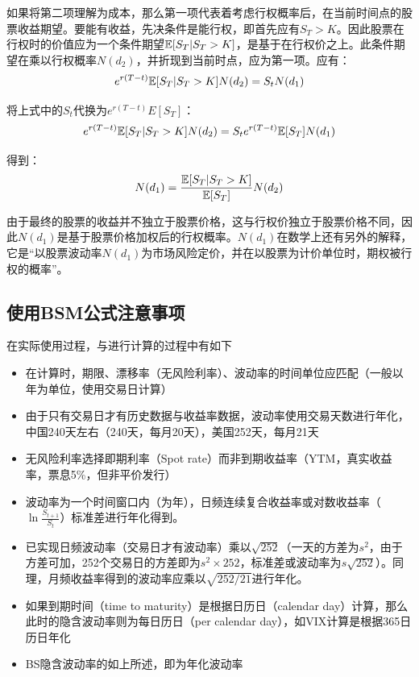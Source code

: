 \documentclass[11pt]{article}
\begin{document}
如果将第二项理解为成本，那么第一项代表着考虑行权概率后，在当前时间点的股票收益期望。要能有收益，先决条件是能行权，即首先应有$S_T>K$。因此股票在行权时的价值应为一个条件期望$\mathbb{E}[S_T | S_T >K]$，是基于在行权价之上。此条件期望在乘以行权概率$N(d_2)$，并折现到当前时点，应为第一项。应有：
\begin{equation*}
    e^{r(T-t)} \mathbb{E}[S_T | S_T >K] N(d_2) = S_t N(d_1)
\end{equation*}

将上式中的$S_t$代换为$e^{r(T-t)}E[S_T]$：
\begin{equation*}
    e^{r(T-t)} \mathbb{E}[S_T | S_T >K] N(d_2) = S_t e^{r(T-t)}\mathbb{E}[S_T] N(d_1)
\end{equation*}

得到：
\begin{equation*}
    N(d_1) = \frac{\mathbb{E}[S_T | S_T >K]}{\mathbb{E}[S_T]} N(d_2)
\end{equation*}

由于最终的股票的收益并不独立于股票价格，这与行权价独立于股票价格不同，因此$N(d_1)$是基于股票价格加权后的行权概率。$N(d_1)$在数学上还有另外的解释，它是“以股票波动率$N(d_1)$为市场风险定价，并在以股票为计价单位时，期权被行权的概率”。

\subsection{使用BSM公式注意事项}

在实际使用过程，与进行计算的过程中有如下
\begin{itemize}[leftmargin=4em]
    \item 在计算时，期限、漂移率（无风险利率）、波动率的时间单位应匹配（一般以年为单位，使用交易日计算）
    \item 由于只有交易日才有历史数据与收益率数据，波动率使用交易天数进行年化，中国240天左右（240天，每月20天），美国252天，每月21天
    \item 无风险利率选择即期利率（Spot rate）而非到期收益率（YTM，真实收益率，票息5\%，但非平价发行）
    \item 波动率为一个时间窗口内（为年），日频连续复合收益率或对数收益率（$\ln\frac{S_{t+1}}{S_{t}}$）标准差进行年化得到。
    \item 已实现日频波动率（交易日才有波动率）乘以$\sqrt{252}$（一天的方差为$s^2$，由于方差可加，252个交易日的方差即为$s^2 \times 252$，标准差或波动率为$s\sqrt{252}$）。同理，月频收益率得到的波动率应乘以$\sqrt{252/21}$进行年化。
    \item 如果到期时间（time to maturity）是根据日历日（calendar day）计算，那么此时的隐含波动率则为每日历日（per calendar day），如VIX计算是根据365日历日年化
    \item BS隐含波动率的如上所述，即为年化波动率
\end{itemize}
\end{document}
